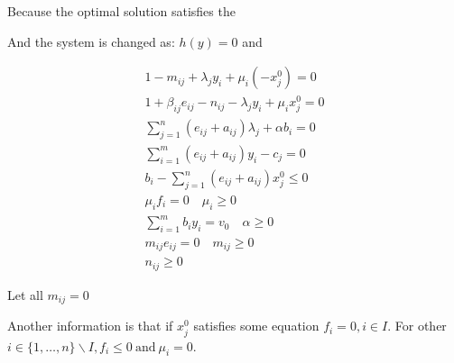 \documentclass[UTF8]{article}
\numberwithin{equation}{section}
\begin{document}
Because the optimal solution satisfies the

And the system is changed as: $h(y)=0$ and

\begin{align*}
  1 - m_{ij}+\lambda_j y_i + \mu_i(-x_j^0) = 0  \\
  1+ \beta_{ij} e_{ij} - n_{ij}-\lambda_j y_i + \mu_i x_j^0 = 0   \\
  \sum_{j=1}^n(e_{ij}+a_{ij})\lambda_j + \alpha b_i = 0 \\
  \sum_{i=1}^m (e_{ij}+a_{ij})y_i-c_j = 0 \\
  b_i - \sum_{j=1}^n (e_{ij}+a_{ij})x_j^0 \leq 0 \\
  \mu_i f_i = 0 \quad \mu_i \geq 0 \\
  \sum_{i=1}^m b_i y_i = v_0 \quad \alpha \geq 0 \\
  m_{ij} e_{ij} =0 \quad m_{ij} \geq 0 \\
  n_{ij} \geq 0
\end{align*}

Let all $m_{ij} = 0$

Another information is that if $x_j^0$ satisfies some equation
$f_i = 0, i \in I$. For other $i \in \{1,\dots,n\}\backslash I, f_i\leq 0 ~\text{and}~ \mu_i = 0$.
\end{document}
